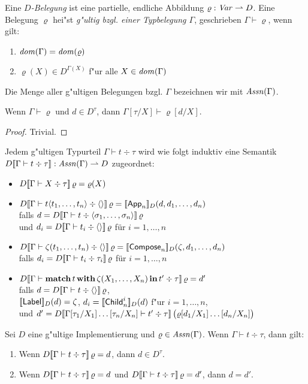 \documentclass[%
  12pt,%
  a4paper,%
]{article}
\newcommand{\match}[3]{\textbf{match}\,{#1}\,\textbf{with}\,{#2}\,\textbf{in}\,{#3}}
\newcommand{\Tj}[3]{{#1}\vdash{#2}\div{#3}}
\begin{document}
Eine \emph{$D$-Belegung} ist eine partielle, endliche Abbildung $\varrho: \mathit{Var} \rightharpoonup D$. Eine Belegung
$\varrho$ hei"st \emph{g"ultig bzgl. einer Typbelegung $\Gamma$}, geschrieben $\Gamma \vdash \varrho$,
wenn gilt:
\begin{enumerate}
\item $\mathit{dom}(\Gamma) = \mathit{dom}(\varrho)$
\item $\varrho(X) \in D^{\Gamma(X)}$ f"ur alle $X \in \mathit{dom}(\Gamma)$
\end{enumerate}
Die Menge aller g"ultigen Belegungen bzgl. $\Gamma$ bezeichnen wir mit $\mathit{Assn}(\Gamma)$.
\begin{lemma}
  Wenn $\Gamma \vdash \varrho$ und $d \in D^\tau$, dann $\Gamma[\tau/X] \vdash \varrho[d/X]$.
\end{lemma}
\begin{proof}
  Trivial.
\end{proof}
Jedem g"ultigen Typurteil $\Tj{\Gamma}{t}{\tau}$ wird wie folgt induktiv
eine Semantik $D\sem{\Tj{\Gamma}{t}{\tau}}: \Assn(\Gamma) \pto D$ zugeordnet:
\begin{itemize}
\item $D\sem{\Tj{\Gamma}{X}{\tau}}\,\varrho = \varrho(X)$
\item $D\sem{\Tj{\Gamma}{t \langle t_1,\ldots,t_n \rangle}{\langle \rangle}}\,\varrho
  = \sem{\App_n}_D(d, d_1, \ldots, d_n)$ \\
  falls $d = D\sem{\Tj{\Gamma}{t}{\langle\sigma_1,\ldots,\sigma_n\rangle}}\,\varrho$ \\
  und $d_i = D\sem{\Tj{\Gamma}{t_i}{\langle \rangle}}\,\varrho$ f\"ur $i=1,\ldots,n$
\item $D\sem{\Tj{\Gamma}{\zeta(t_1,\ldots,t_n)}{\langle \rangle}}\,\varrho
  = \sem{\Compose_n}_D(\zeta,d_1,\ldots,d_n)$ \\
  falls $d_i = D\sem{\Tj{\Gamma}{t_i}{\tau_i}}\,\varrho$ f\"ur $i=1,\ldots,n$
\item $D\sem{\Tj{\Gamma}{\match{t}{\zeta(X_1,\ldots,X_n)}{t'}}{\tau}}\,\varrho
  = d'$ \\
  falls $d = D\sem{\Tj{\Gamma}{t}{\langle \rangle}}\,\varrho$, \\
  $[\![\mathsf{Label}]\!]_D(d) = \zeta$, $d_i = [\![\mathsf{Child}_n^i]\!]_D(d)$ f"ur $i=1,\ldots,n$, \\
  und $d' = D\sem{\Tj{\Gamma[\tau_1/X_1]\ldots[\tau_n/X_n]}{t'}{\tau}}\,\bigl(\varrho[d_1/X_1]\ldots[d_n/X_n]\bigr)$
\end{itemize}

\begin{lemma} \label{lem:Wohldefiniertheit_der_Semantik}
  Sei $D$ eine g"ultige Implementierung und $\varrho \in \mathit{Assn}(\Gamma)$.
  Wenn $\Tj{\Gamma}{t}{\tau}$, dann gilt:
  \begin{enumerate}
  \item Wenn $D\sem{\Tj{\Gamma}{t}{\tau}}\,\varrho = d$, dann $d \in D^\tau$.
  \item Wenn $D\sem{\Tj{\Gamma}{t}{\tau}}\,\varrho = d$ und $D\sem{\Tj{\Gamma}{t}{\tau}}\,\varrho = d'$,
    dann $d = d'$.
  \end{enumerate}
\end{lemma}
\end{document}
